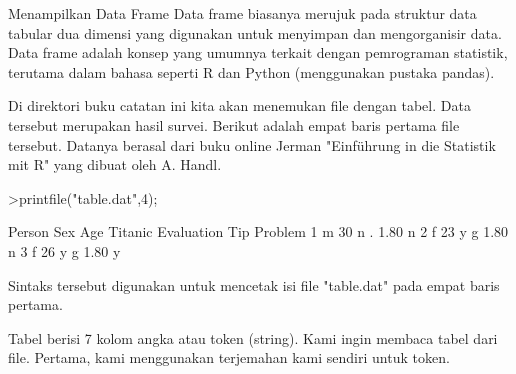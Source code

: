 \documentclass[a4paper,10pt]{article}
\begin{document}
\begin{eulernotebook}
\begin{eulercomment}
\begin{eulercomment}
\begin{eulercomment}
\begin{eulercomment}
\begin{eulercomment}
\begin{eulercomment}
\begin{eulercomment}
\begin{eulercomment}
\begin{eulercomment}
\begin{eulercomment}
\begin{eulercomment}
\begin{eulercomment}
\begin{eulercomment}
\begin{eulercomment}
\begin{eulercomment}
\begin{eulercomment}
\begin{eulercomment}
\end{eulercomment}
\eulersubheading{}
\begin{eulercomment}
Menampilkan Data Frame 
Data frame biasanya merujuk pada struktur data tabular dua dimensi
yang digunakan untuk menyimpan dan mengorganisir data. Data frame
adalah konsep yang umumnya terkait dengan pemrograman statistik,
terutama dalam bahasa seperti R dan Python (menggunakan pustaka
pandas).

Di direktori buku catatan ini kita akan menemukan file dengan tabel.
Data tersebut merupakan hasil survei. Berikut adalah empat baris
pertama file tersebut. Datanya berasal dari buku online Jerman
"Einführung in die Statistik mit R" yang dibuat oleh A. Handl.
\end{eulercomment}
\begin{eulerprompt}
>printfile("table.dat",4);
\end{eulerprompt}
\begin{euleroutput}
  Person Sex Age Titanic Evaluation Tip Problem
  1 m 30 n . 1.80 n
  2 f 23 y g 1.80 n
  3 f 26 y g 1.80 y
\end{euleroutput}
\begin{eulercomment}
Sintaks tersebut digunakan untuk mencetak isi file "table.dat" pada
empat baris pertama.

Tabel berisi 7 kolom angka atau token (string). Kami ingin membaca
tabel dari file. Pertama, kami menggunakan terjemahan kami sendiri
untuk token.


\end{eulercomment}
\end{eulercomment}
\end{eulercomment}
\end{eulercomment}
\end{eulercomment}
\end{eulercomment}
\end{eulercomment}
\end{eulercomment}
\end{eulercomment}
\end{eulercomment}
\end{eulercomment}
\end{eulercomment}
\end{eulercomment}
\end{eulercomment}
\end{eulercomment}
\end{eulercomment}
\end{eulercomment}
\end{eulernotebook}
\end{document}
